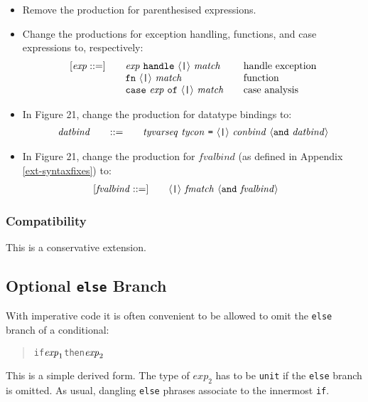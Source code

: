 \documentclass[twoside,titlepage]{article}
\begin{document}
\begin{appendix}
\begin{itemize}
\item Remove the production for parenthesised expressions.

\item Change the productions for exception handling, functions, and case expressions to, respectively:
  $$
  \begin{array}{l@{\qquad}l@{\qquad}l}
  [\mathit{exp} ::=] & \mathit{exp}~{\tt{handle}}~\langle\mbox{\tt|}\rangle~\mathit{match} & \textrm{handle exception} \\
  & {\tt{fn}}~\langle\mbox{\tt|}\rangle~\mathit{match} & \textrm{function} \\
  & {\tt{case}}~\mathit{exp}~{\tt{of}}~\langle\mbox{\tt|}\rangle~\mathit{match} & \textrm{case analysis}
  \end{array}
  $$

\item In Figure 21, change the production for datatype bindings to:
  $$
  \begin{array}{l@{\qquad}l@{\qquad}l}
  \mathit{datbind} &::= & \mathit{tyvarseq}~\mathit{tycon}~\mbox{\tt=}~\langle\mbox{\tt|}\rangle~\mathit{conbind}~\langle{\tt{and}}~\mathit{datbind}\rangle
  \end{array}
  $$

\item In Figure 21, change the production for $\mathit{fvalbind}$ (as defined in Appendix \ref{ext-syntaxfixes}) to:
  $$
  \begin{array}{l@{\qquad}l@{\qquad}l}
  [\mathit{fvalbind} ::=] & \langle\mbox{\tt|}\rangle~\mathit{fmatch}~\langle{\tt{and}}~\mathit{fvalbind}\rangle \\
  \end{array}
  $$
\end{itemize}

\subsubsection*{Compatibility}

This is a conservative extension.


\subsection{Optional {\tt else} Branch}
\label{ext-else}

With imperative code it is often convenient to be allowed to omit the {\tt else} branch of a conditional:
\begin{quote}
\begin{alltt}
if \(\mathit{exp}\sb1\) then \(\mathit{exp}\sb2\)
\end{alltt}
\end{quote}
This is a simple derived form. The type of $\mathit{exp}_2$ has to be {\tt unit} if the {\tt else} branch is omitted. As usual, dangling {\tt else} phrases associate to the innermost {\tt if}.



\end{appendix}
\end{document}
